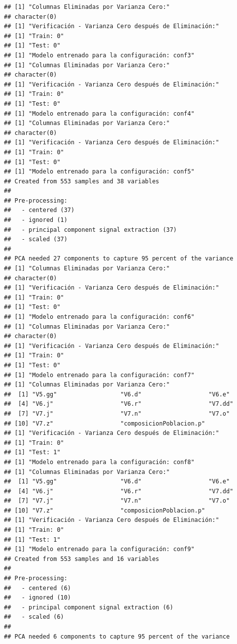 \documentclass[
]{article}
\begin{document}
\begin{verbatim}
## [1] "Columnas Eliminadas por Varianza Cero:"
## character(0)
## [1] "Verificación - Varianza Cero después de Eliminación:"
## [1] "Train: 0"
## [1] "Test: 0"
## [1] "Modelo entrenado para la configuración: conf3"
## [1] "Columnas Eliminadas por Varianza Cero:"
## character(0)
## [1] "Verificación - Varianza Cero después de Eliminación:"
## [1] "Train: 0"
## [1] "Test: 0"
## [1] "Modelo entrenado para la configuración: conf4"
## [1] "Columnas Eliminadas por Varianza Cero:"
## character(0)
## [1] "Verificación - Varianza Cero después de Eliminación:"
## [1] "Train: 0"
## [1] "Test: 0"
## [1] "Modelo entrenado para la configuración: conf5"
## Created from 553 samples and 38 variables
## 
## Pre-processing:
##   - centered (37)
##   - ignored (1)
##   - principal component signal extraction (37)
##   - scaled (37)
## 
## PCA needed 27 components to capture 95 percent of the variance
## [1] "Columnas Eliminadas por Varianza Cero:"
## character(0)
## [1] "Verificación - Varianza Cero después de Eliminación:"
## [1] "Train: 0"
## [1] "Test: 0"
## [1] "Modelo entrenado para la configuración: conf6"
## [1] "Columnas Eliminadas por Varianza Cero:"
## character(0)
## [1] "Verificación - Varianza Cero después de Eliminación:"
## [1] "Train: 0"
## [1] "Test: 0"
## [1] "Modelo entrenado para la configuración: conf7"
## [1] "Columnas Eliminadas por Varianza Cero:"
##  [1] "V5.gg"                  "V6.d"                   "V6.e"                  
##  [4] "V6.j"                   "V6.r"                   "V7.dd"                 
##  [7] "V7.j"                   "V7.n"                   "V7.o"                  
## [10] "V7.z"                   "composicionPoblacion.p"
## [1] "Verificación - Varianza Cero después de Eliminación:"
## [1] "Train: 0"
## [1] "Test: 1"
## [1] "Modelo entrenado para la configuración: conf8"
## [1] "Columnas Eliminadas por Varianza Cero:"
##  [1] "V5.gg"                  "V6.d"                   "V6.e"                  
##  [4] "V6.j"                   "V6.r"                   "V7.dd"                 
##  [7] "V7.j"                   "V7.n"                   "V7.o"                  
## [10] "V7.z"                   "composicionPoblacion.p"
## [1] "Verificación - Varianza Cero después de Eliminación:"
## [1] "Train: 0"
## [1] "Test: 1"
## [1] "Modelo entrenado para la configuración: conf9"
## Created from 553 samples and 16 variables
## 
## Pre-processing:
##   - centered (6)
##   - ignored (10)
##   - principal component signal extraction (6)
##   - scaled (6)
## 
## PCA needed 6 components to capture 95 percent of the variance

\end{verbatim}
\end{document}
